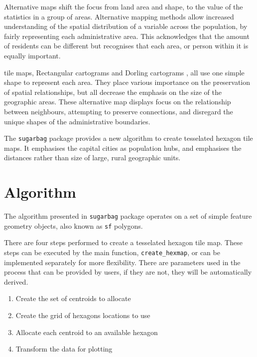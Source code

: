 \documentclass{monashthesis}
\begin{document}
Alternative maps shift the focus from land area and shape, to the value of the statistics in a group of areas.
Alternative mapping methods allow increased understanding of the spatial distribution of a variable across the population, by fairly representing each administrative area. This acknowledges that the amount of residents can be different but recognises that each area, or person within it is equally important.

tile maps, Rectangular cartograms \autocite{ORC} and Dorling cartograms \autocite{ACTUC}, all use one simple shape to represent each area. They place various importance on the preservation of spatial relationships, but all decrease the emphasis on the size of the geographic areas. These alternative map displays focus on the relationship between neighbours, attempting to preserve connections, and disregard the unique shapes of the administrative boundaries.

The \texttt{sugarbag} package provides a new algorithm to create tesselated hexagon tile maps.
It emphasises the capital cities as population hubs, and emphasises the distances rather than size of large, rural geographic units.

\hypertarget{algorithm}{%
\section{Algorithm}\label{algorithm}}

The algorithm presented in \texttt{sugarbag} package operates on a set of simple feature geometry objects, also known as \texttt{sf} \autocite{sf} polygons.

There are four steps performed to create a tesselated hexagon tile map.
These steps can be executed by the main function, \texttt{create\_hexmap}, or can be implemented separately for more flexibility. There are parameters used in the process that can be provided by users, if they are not, they will be automatically derived.

\begin{enumerate}
\def\labelenumi{\arabic{enumi}.}
\tightlist
\item
  Create the set of centroids to allocate
\item
  Create the grid of hexagons locations to use
\item
  Allocate each centroid to an available hexagon
\item
  Transform the data for plotting
\end{enumerate}
\end{document}
